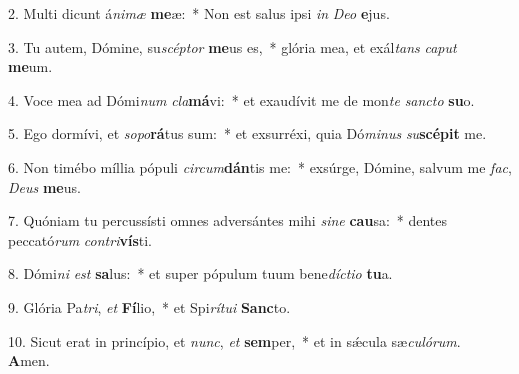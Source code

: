 2. Multi dicunt á\textit{ni}\textit{mæ} \textbf{me}æ:~*  Non est salus ipsi \textit{in} \textit{De}\textit{o} \textbf{e}jus.\

3. Tu autem, Dómine, su\textit{scép}\textit{tor} \textbf{me}us es,~*  glória mea, et exál\textit{tans} \textit{ca}\textit{put} \textbf{me}um.\

4. Voce mea ad Dómi\textit{num} \textit{cla}\textbf{má}vi:~*  et exaudívit me de mon\textit{te} \textit{sanc}\textit{to} \textbf{su}o.\

5. Ego dormívi, et \textit{so}\textit{po}\textbf{rá}tus sum:~*  et exsurréxi, quia Dó\textit{mi}\textit{nus} \textit{su}\textbf{scé}\textbf{pit} me.\

6. Non timébo míllia pópuli \textit{cir}\textit{cum}\textbf{dán}tis me:~*  exsúrge, Dómine, salvum me \textit{fac}, \textit{De}\textit{us} \textbf{me}us.\

7. Quóniam tu percussísti omnes adversántes mihi \textit{si}\textit{ne} \textbf{cau}sa:~*  dentes peccató\textit{rum} \textit{con}\textit{tri}\textbf{vís}ti.\

8. Dómi\textit{ni} \textit{est} \textbf{sa}lus:~*  et super pópulum tuum bene\textit{díc}\textit{ti}\textit{o} \textbf{tu}a.\

9. Glória Pa\textit{tri}, \textit{et} \textbf{Fí}lio,~*  et Spi\textit{rí}\textit{tu}\textit{i} \textbf{Sanc}to.\

10. Sicut erat in princípio, et \textit{nunc}, \textit{et} \textbf{sem}per,~*  et in sǽcula sæ\textit{cu}\textit{ló}\textit{rum}. \textbf{A}men.\

